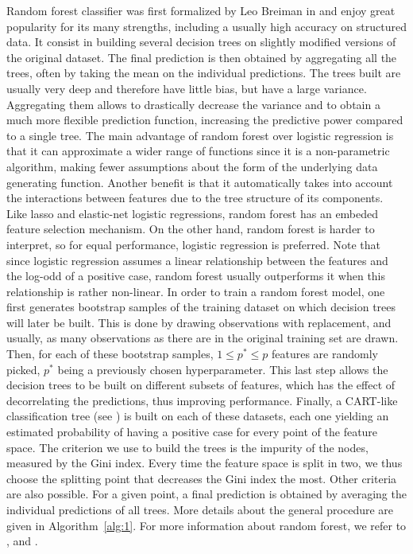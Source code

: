 \documentclass{article}
\begin{document}
Random forest classifier was first formalized by Leo Breiman in \cite{breiman2001random} and enjoy great popularity for its many strengths, including a usually high accuracy on structured data. It consist in building several decision trees on slightly modified versions of the original dataset. The final prediction is then obtained by aggregating all the trees, often by taking the mean on the individual predictions. The trees built are usually very deep and therefore have little bias, but have a large variance. Aggregating them allows to drastically decrease the variance and to obtain a much more flexible prediction function, increasing the predictive power compared to a single tree. The main advantage of random forest over logistic regression is that it can approximate a wider range of functions since it is a non-parametric algorithm, making fewer assumptions about the form of the underlying data generating function. Another benefit is that it automatically takes into account the interactions between features due to the tree structure of its components. Like lasso and elastic-net logistic regressions, random forest has an embeded feature selection mechanism. On the other hand, random forest is harder to interpret, so for equal performance, logistic regression is preferred. Note that since logistic regression assumes a linear relationship between the features and the log-odd of a positive case, random forest usually outperforms it when this relationship is rather non-linear. In order to train a random forest model, one first generates bootstrap samples of the training dataset on which decision trees will later be built. This is done by drawing observations with replacement, and usually, as many observations as there are in the original training set are drawn. Then, for each of these bootstrap samples, $1 \le p^* \le p$ features are randomly picked, $p^*$ being a previously chosen hyperparameter. This last step allows the decision trees to be built on different subsets of features, which has the effect of decorrelating the predictions, thus improving performance. Finally, a CART-like classification tree (see \cite{breiman1984classification}) is built on each of these datasets, each one yielding an estimated probability of having a positive case for every point of the feature space. The criterion we use to build the trees is the impurity of the nodes, measured by the Gini index. Every time the feature space is split in two, we thus choose the splitting point that decreases the Gini index the most. Other criteria are also possible. For a given point, a final prediction is obtained by averaging the individual predictions of all trees. More details about the general procedure are given in Algorithm~\ref{alg:1}. For more information about random forest, we refer to \cite{breiman2001random}, \cite{hastie2015statistical} and \cite{hastie2016introduction}.
\end{document}
